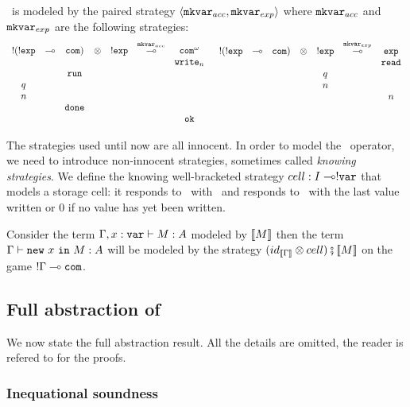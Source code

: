 \iamkvar\ is modeled by the paired strategy $\langle \texttt{mkvar}_{acc} , \texttt{mkvar}_{exp}
\rangle$ where $\texttt{mkvar}_{acc}$ and $\texttt{mkvar}_{exp}$ are the following strategies:
$$
\begin{array}{ccccccc}
!(!\texttt{exp} & \multimap & \texttt{com}) & \otimes & !\texttt{exp} & \stackrel{\texttt{mkvar}_{acc}}{\multimap} & \texttt{com}^\omega\\
&&&&&&\texttt{write}_n\\
&&\texttt{run}\\
q\\
n\\
&&\texttt{done} \\
&&&&&&\texttt{ok}
\end{array}
\hspace{0.2cm}
\begin{array}{ccccccc}
!(!\texttt{exp} & \multimap & \texttt{com}) & \otimes & !\texttt{exp} & \stackrel{\texttt{mkvar}_{exp}}{\multimap} & \texttt{exp}\\
&&&&&&\texttt{read}\\
&&&&q\\
&&&&n\\
&&&&&&n \\ \  \\ \
\end{array}
$$


The strategies used until now are all innocent. In order to model
the \ianew\ operator, we need to introduce non-innocent strategies,
sometimes called \emph{knowing strategies}. We define the knowing
well-bracketed strategy $cell : I \multimap !\texttt{var}$ that models a
storage cell: it responds to \iawrite\ with \iaok\ and responds to
\iaread\ with the last value written or $0$ if no value has yet been
written.

Consider the term $\Gamma,x:\texttt{var} \vdash M : A$ modeled by
${[\![ M ]\!]}$ then the term
 $\Gamma \vdash \texttt{new}\ x\ \texttt{in}\ M : A$  will be modeled by the strategy $(id_{{[\![ \Gamma ]\!]}} \otimes cell) \fatsemi {[\![M ]\!]}$ on the game
 $!\Gamma \multimap \texttt{com}$.

\subsection{Full abstraction of \ialgol}

We now state the full abstraction result. All the details are omitted, the reader is refered
to \cite{abramsky:game-semantics-tutorial,AM97a} for the proofs.

\subsubsection{Inequational soundness}

